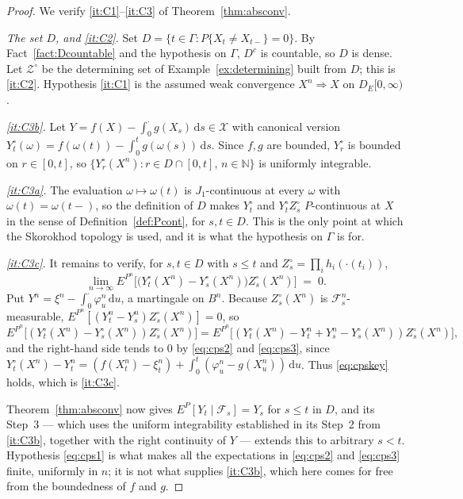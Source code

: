 \documentclass[11pt,a4paper]{article}
\theoremstyle{plain}
\theoremstyle{definition}
\theoremstyle{remark}
\newcommand{\N}{\mathbb{N}}
\newcommand{\DE}{D_E[0,\infty)}
\newcommand{\Filt}{\mathcal{F}}
\newcommand{\XX}{\mathcal{X}}                  %
\newcommand{\ZZ}{\mathcal{Z}}                  %
\newcommand{\dif}{\,\mathrm{d}}
\DeclareMathOperator*{\wto}{\Rightarrow}
\begin{document}
\begin{proof}
  We verify \ref{it:C1}--\ref{it:C3} of Theorem~\ref{thm:absconv}.

  \emph{The set $D$, and \ref{it:C2}.}
  Set $D = \{ t \in \Gamma : P\{X_t \neq X_{t-}\} = 0 \}$.  By
  Fact~\ref{fact:Dcountable} and the hypothesis on $\Gamma$, $D^c$ is countable,
  so $D$ is dense.  Let $\ZZ^\circ$ be the determining set of
  Example~\ref{ex:determining} built from $D$; this is \ref{it:C2}.
  Hypothesis \ref{it:C1} is the assumed weak convergence $X^n \wto X$ on $\DE$.

  \emph{\ref{it:C3b}.}
  Let $Y = f(X) - \int_0^\cdot g(X_s)\dif s \in \XX$ with canonical version
  $Y^\circ_t(\omega) = f(\omega(t)) - \int_0^t g(\omega(s))\dif s$.  Since $f,g$
  are bounded, $Y^\circ_r$ is bounded on $r \in [0,t]$, so
  $\{Y^\circ_r(X^n) : r \in D \cap [0,t],\, n \in \N\}$ is uniformly integrable.

  \emph{\ref{it:C3a}.}
  The evaluation $\omega \mapsto \omega(t)$ is $J_1$-continuous at every $\omega$
  with $\omega(t) = \omega(t-)$, so the definition of $D$ makes $Y^\circ_t$ and
  $Y^\circ_t Z^\circ_s$ $P$-continuous at $X$ in the sense of
  Definition~\ref{def:Pcont}, for $s,t \in D$.  This is the only point at which
  the Skorokhod topology is used, and it is what the hypothesis on $\Gamma$ is
  for.

  \emph{\ref{it:C3c}.}
  It remains to verify, for $s,t \in D$ with $s \leq t$ and
  $Z^\circ_s = \prod_i h_i(\cdot(t_i))$,
  \begin{equation}
    \label{eq:cpskey}
    \lim_{n \to \infty}
      E^{P^n}\bigl[ \bigl( Y^\circ_t(X^n) - Y^\circ_s(X^n) \bigr) Z^\circ_s(X^n) \bigr]
      \;=\; 0 .
  \end{equation}
  Put $Y^n = \xi^n - \int_0^{\cdot} \varphi^n_u \dif u$, a martingale on $B^n$.
  Because $Z^\circ_s(X^n)$ is $\Filt^n_s$-measurable,
  $E^{P^n}[(Y^n_t - Y^n_s) Z^\circ_s(X^n)] = 0$, so
  \[
    E^{P^n}\bigl[ ( Y^\circ_t(X^n) - Y^\circ_s(X^n) ) Z^\circ_s(X^n) \bigr]
    = E^{P^n}\bigl[ ( Y^\circ_t(X^n) - Y^n_t + Y^n_s - Y^\circ_s(X^n) )
      Z^\circ_s(X^n) \bigr] ,
  \]
  and the right-hand side tends to $0$ by \eqref{eq:cps2} and \eqref{eq:cps3},
  since
  $Y^\circ_t(X^n) - Y^n_t = (f(X^n_t) - \xi^n_t)
    + \int_0^t (\varphi^n_u - g(X^n_u)) \dif u$.
  Thus \eqref{eq:cpskey} holds, which is \ref{it:C3c}.

  Theorem~\ref{thm:absconv} now gives $E^P[Y_t \mid \Filt_s] = Y_s$ for
  $s \leq t$ in $D$, and its Step~3 --- which uses the uniform integrability
  established in its Step~2 from \ref{it:C3b}, together with the right continuity
  of $Y$ --- extends this to arbitrary $s < t$.  Hypothesis \eqref{eq:cps1} is
  what makes all the expectations in \eqref{eq:cps2} and \eqref{eq:cps3} finite,
  uniformly in $n$; it is not what supplies \ref{it:C3b}, which here comes for
  free from the boundedness of $f$ and $g$.
\end{proof}
\end{document}

